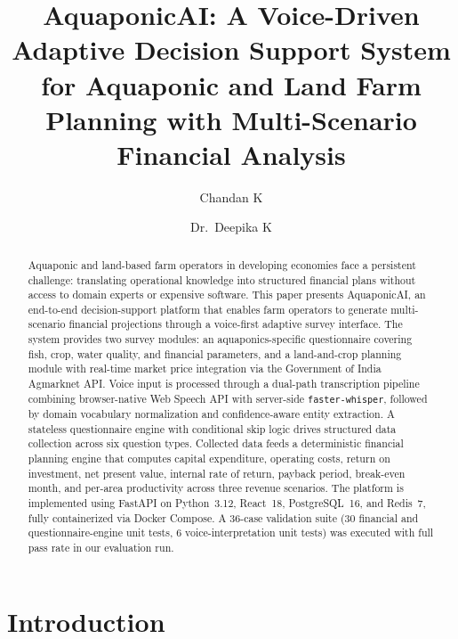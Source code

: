 \documentclass[runningheads]{llncs}
\title{AquaponicAI: A Voice-Driven Adaptive Decision Support System
for Aquaponic and Land Farm Planning with Multi-Scenario
Financial Analysis}
\author{Chandan K\inst{1} \and Dr.~Deepika K\inst{1}}
\institute{
  Department of MCA, RV College of Engineering,\\
  Bengaluru, Karnataka, India\\
  \email{\{chandank.mca24, deepikak\}@rvce.edu.in}
}
\begin{document}
\maketitle

\begin{abstract}
Aquaponic and land-based farm operators in developing economies face a
persistent challenge: translating operational knowledge into structured
financial plans without access to domain experts or expensive software.
This paper presents AquaponicAI, an end-to-end decision-support platform
that enables farm operators to generate multi-scenario financial projections
through a voice-first adaptive survey interface. The system provides two
survey modules: an aquaponics-specific questionnaire covering fish, crop,
water quality, and financial parameters, and a land-and-crop planning
module with real-time market price integration via the Government of India
Agmarknet API. Voice input is processed through a dual-path transcription
pipeline combining browser-native Web Speech API with server-side
\texttt{faster-whisper}, followed by domain vocabulary normalization and
confidence-aware entity extraction. A stateless questionnaire engine with
conditional skip logic drives structured data collection across six question
types. Collected data feeds a deterministic financial planning engine that
computes capital expenditure, operating costs, return on investment, net
present value, internal rate of return, payback period, break-even month,
and per-area productivity across three revenue scenarios. The platform is
implemented using FastAPI on Python~3.12, React~18, PostgreSQL~16, and
Redis~7, fully containerized via Docker Compose. A 36-case validation suite
(30 financial and questionnaire-engine unit tests, 6 voice-interpretation
unit tests) was executed with full pass rate in our evaluation run.

\end{abstract}


\section{Introduction}
\label{sec:intro}
\end{document}
